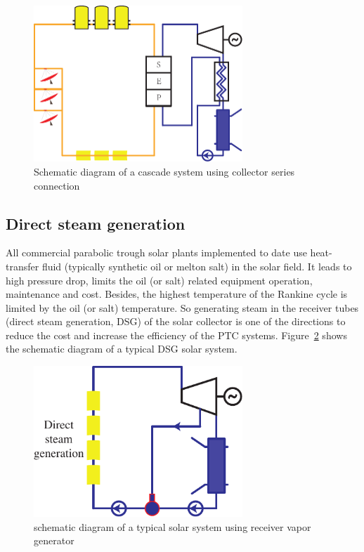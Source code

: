 \begin{figure}[!ht]
\centering 
\includegraphics[width=0.7\textwidth]{fig/SeriesCollector}
\caption{Schematic diagram of a cascade system using collector series connection}\label{fig:SeriesCollector}
\end{figure}

\subsection{Direct steam generation}

All commercial parabolic trough solar plants implemented to date use heat-transfer fluid (typically synthetic oil or melton salt) in the solar field. It leads to high pressure drop, limits the oil (or salt) related equipment operation, maintenance and cost. Besides, the highest temperature of the Rankine cycle is limited by the oil (or salt) temperature. So generating steam in the receiver tubes (direct steam generation, DSG) of the solar collector is one of the directions to reduce the cost and increase the efficiency of the PTC systems. Figure~\ref{fig:DSG} shows the schematic diagram of a typical DSG solar system.

\begin{figure}[!ht]
\centering 
\includegraphics[width=0.7\textwidth]{fig/DSG}
\caption{schematic diagram of a typical solar system using receiver vapor generator}\label{fig:DSG}
\end{figure}

